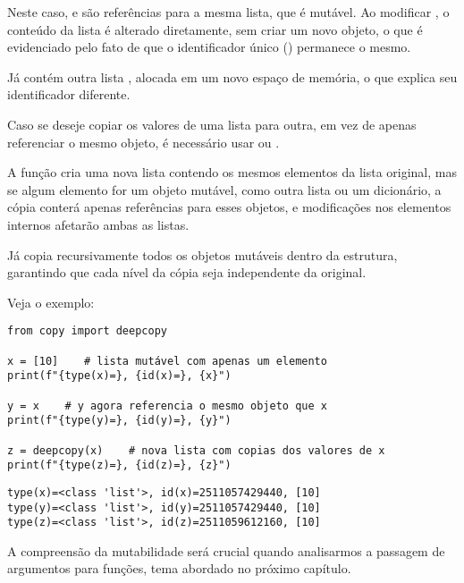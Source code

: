 Neste caso,  e  são referências para a mesma lista, que é mutável.
Ao modificar , o conteúdo da lista é alterado diretamente, sem criar um novo objeto, o que é evidenciado
pelo fato de que o identificador único () permanece o mesmo.

Já  contém outra lista \inlcode{[10]}, alocada em um novo espaço de memória, o que explica seu
identificador diferente.

Caso se deseje copiar os valores de uma lista para outra, em vez de apenas referenciar o mesmo objeto,
é necessário usar  ou .

A função  cria uma nova lista contendo os mesmos elementos da lista original, mas se algum elemento
for um objeto mutável, como outra lista ou um dicionário, a cópia conterá apenas referências para esses objetos, e
modificações nos elementos internos afetarão ambas as listas.

Já  copia recursivamente todos os objetos mutáveis dentro da estrutura, garantindo que cada
nível da cópia seja independente da original.

Veja o exemplo:
\begin{verbatim}
from copy import deepcopy

x = [10]    # lista mutável com apenas um elemento
print(f"{type(x)=}, {id(x)=}, {x}")

y = x    # y agora referencia o mesmo objeto que x
print(f"{type(y)=}, {id(y)=}, {y}")

z = deepcopy(x)    # nova lista com copias dos valores de x
print(f"{type(z)=}, {id(z)=}, {z}")
\end{verbatim}
\begin{verbatim}
type(x)=<class 'list'>, id(x)=2511057429440, [10]
type(y)=<class 'list'>, id(y)=2511057429440, [10]
type(z)=<class 'list'>, id(z)=2511059612160, [10]
\end{verbatim}

A compreensão da mutabilidade será crucial quando analisarmos a passagem de argumentos para funções,
tema abordado no próximo capítulo.





























